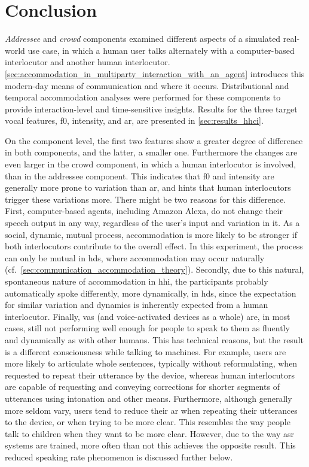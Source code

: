 \section{Conclusion}
\label{sec:discussion_hhci}

\emph{Addressee} and \emph{crowd} components examined different aspects of a simulated real-world use case, in which a human user talks alternately with a computer-based interlocutor and another human interlocutor.
\cref{sec:accommodation_in_multiparty_interaction_with_an_agent} introduces this modern-day means of communication and where it occurs.
Distributional and temporal accommodation analyses were performed for these components to provide interaction-level and time-sensitive insights.
Results for the three target vocal features, \ac{f0}, intensity, and \ac{ar}, are presented in \cref{sec:results_hhci}.

On the component level, the first two features show a greater degree of difference in both components, and the latter, a smaller one.
Furthermore the changes are even larger in the crowd component, in which a human interlocutor is involved, than in the addressee component.
This indicates that \ac{f0} and intensity are generally more prone to variation than \ac{ar}, and hints that human interlocutors trigger these variations more.
There might be two reasons for this difference.
First, computer-based agents, including Amazon Alexa, do not change their speech output in any way, regardless of the user's input and variation in it.
As a social, dynamic, mutual process, accommodation is more likely to be stronger if both interlocutors contribute to the overall effect.
In this experiment, the process can only be mutual in \ac{hds}, where accommodation may occur naturally (cf.\ \cref{sec:communication_accommodation_theory}).
Secondly, due to this natural, spontaneous nature of accommodation in \ac{hhi}, the participants probably automatically spoke differently, more dynamically, in \ac{hds}, since the expectation for similar variation and dynamics is inherently expected from a human interlocutor.
Finally, \acp{va} (and voice-activated devices as a whole) are, in most cases, still not performing well enough for people to speak to them as fluently and dynamically as with other humans.
This has technical reasons, but the result is a different consciousness while talking to machines.
For example, users are more likely to articulate whole sentences, typically without reformulating, when requested to repeat their utterance by the device, whereas human interlocutors are capable of requesting and conveying corrections for shorter segments of utterances using intonation and other means.
Furthermore, although generally more seldom vary, users tend to reduce their \ac{ar} when repeating their utterances to the device, or when trying to be more clear.
This resembles the way people talk to children when they want to be more clear.
However, due to the way \ac{asr} systems are trained, more often than not this achieves the opposite result.
This reduced speaking rate phenomenon is discussed further below.

